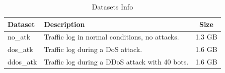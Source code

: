 \begin{table}[h]
\centering
\begin{tabular}{|l|l|c|}
\hline
\textbf{Dataset} & \textbf{Description}                              & \textbf{Size} \\ \hline
no\_atk          & Traffic log in normal conditions, no attacks. & 1.3 GB        \\ 
dos\_atk         & Traffic log during a DoS attack.                   & 1.6 GB        \\ 
ddos\_atk        & Traffic log during a DDoS attack with 40 bots. & 1.6 GB        \\ \hline
\end{tabular}
\caption{Datasets Info}
\label{tab:dataset_info}
\end{table}
